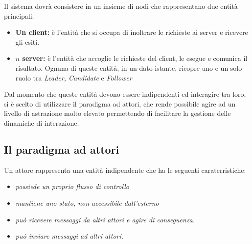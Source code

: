 Il sistema dovrà consistere in un insieme di nodi che rappresentano due entità principali:
	\begin{itemize}
		\item \textbf{Un client:} è l'entità che si occupa di inoltrare le richieste ai server e ricevere gli esiti.
		\item \textbf{$n$ server:} è l'entità che accoglie le richieste del client, le esegue e comunica il risultato. Ognuna di queste entità, in un dato istante, ricopre uno e un solo ruolo tra \textit{Leader, Candidate} e \textit{Follower}
	\end{itemize}

Dal momento che queste entità devono essere indipendenti ed interagire tra loro, si è scelto di utilizzare il paradigma ad attori, che rende possibile agire ad un livello di astrazione molto elevato permettendo di facilitare la gestione delle dinamiche di interazione.


	\subsection{Il paradigma ad attori} \label{Actors}
	Un attore rappresenta una entità indipendente che ha le seguenti caraterristiche:
	\begin{itemize}
		\item \emph{possiede un proprio flusso di controllo}
		\item \emph{mantiene uno stato, non accessibile dall'esterno}
		\item \emph{può ricevere messaggi da altri attori e agire di conseguenza.}
		\item \emph{può inviare messaggi ad altri attori.}
	\end{itemize}
